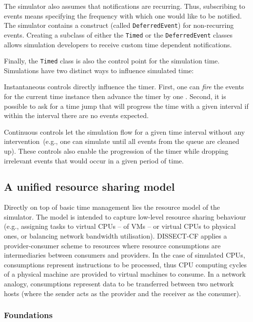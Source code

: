 \documentclass[sort, compress, 5p]{elsarticle}
\newcommand{\SMALLESTIMEGRANULARITY}{}
\begin{document}
The simulator also assumes that notifications are recurring. Thus, subscribing to events means specifying the frequency with which one would like to be notified. The simulator contains a construct (called \verb+DeferredEvent+) for non-recurring events. Creating a subclass of either the \verb+Timed+ or the \verb+DeferredEvent+ classes allows simulation developers to receive custom time dependent notifications.

Finally, the \verb+Timed+ class is also the control point for the simulation time. Simulations have two distinct ways to influence simulated time:
\begin{description*}
\item[Instantaneous] controls directly influence the timer. First, one can \emph{fire} the events for the current time instance then advance the timer by one \SMALLESTIMEGRANULARITY. Second, it is possible to ask for a time jump that will progress the time with a given interval if within the interval there are no events expected.
\item[Continuous] controls let the simulation flow for a given time interval without any intervention~(e.g., one can simulate until all events from the queue are cleaned up). These controls also enable the progression of the timer while dropping irrelevant events that would occur in a given period of time.
\end{description*}

\subsection{A unified resource sharing model} \label{Sec-URSM}

Directly on top of basic time management lies the resource model of the simulator. The model is intended to capture low-level resource sharing behaviour (e.g., assigning tasks to virtual CPUs -- of VMs -- or virtual CPUs to physical ones, or balancing network bandwidth utilisation). DISSECT-CF applies a provider-consumer scheme to resources where resource consumptions are intermediaries between consumers and providers. In the case of simulated CPUs, consumptions represent instructions to be processed, thus CPU computing cycles of a physical machine are provided to virtual machines to consume.  In a network analogy, consumptions represent data to be transferred between two network hosts (where the sender acts as the provider and the receiver as the consumer).

\subsubsection{Foundations}
\end{document}
